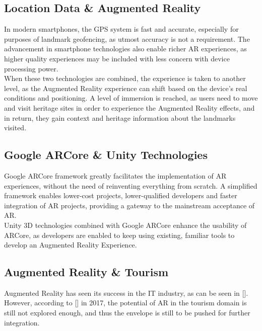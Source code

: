\subsection{Location Data \&  Augmented Reality}
In modern smartphones, the GPS system is fast and accurate, especially for purposes of landmark geofencing, 
as utmost accuracy is not a requirement. The advancement in smartphone technologies also enable richer AR experiences, as higher quality 
experiences may be included with less concern with device processing power.\\
When these two technologies are combined, the experience is taken to another level, as the Augmented Reality experience can shift based on 
the device's real conditions and positioning. A level of immersion is reached, as users need to move and visit heritage sites in 
order to experience the Augmented Reality effects, and in return, they gain context and heritage information about the landmarks visited.   
\subsection{Google ARCore \& Unity Technologies}
Google ARCore framework greatly facilitates the implementation of AR experiences, without the need of reinventing everything from scratch. 
A simplified framework enables lower-cost projects, lower-qualified developers and faster integration of AR projects, 
providing a gateway to the mainstream acceptance of AR.\\
Unity 3D technologies combined with Google ARCore enhance the usability of ARCore, as developers are enabled to keep using existing, 
familiar tools to develop an Augmented Reality Experience. 
\subsection{Augmented Reality \& Tourism}
Augmented Reality has seen its success in the IT industry, as can be seen in []. However, according to [] in 2017, the potential of AR
in the tourism domain is still not explored enough, and thus the envelope is still to be pushed for further integration.